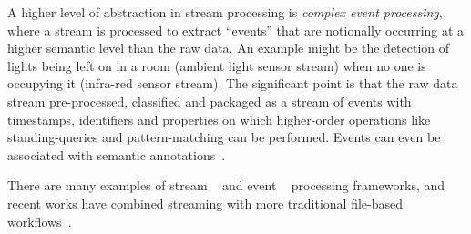 A higher level of abstraction in stream processing is \emph{complex event processing}, where a
stream is processed to extract ``events'' that 
are notionally occurring at a higher semantic level than the raw
data. An example might be the detection of lights being left on in a room (ambient light sensor
stream) when no one is occupying it (infra-red sensor stream). The significant point is that the raw data
stream pre-processed, classified and packaged as a stream of events with timestamps, identifiers and properties on which
higher-order operations like standing-queries and pattern-matching can be performed. Events can even
be associated with semantic annotations~\cite{Teymourian:EDBT:2010, Zhou:debs:2011}. 

There are many examples of stream
~\cite{chandrasekaran:telegraphcq2003, abadi:borealis2005, liew:streamgraph2010} and event
~\cite{ESPER, siddhi, MicrosoftInsight} processing frameworks, and recent works have combined
streaming with more traditional file-based workflows~\cite{ZinnCluster,Herath:CCGrid:2010}.






